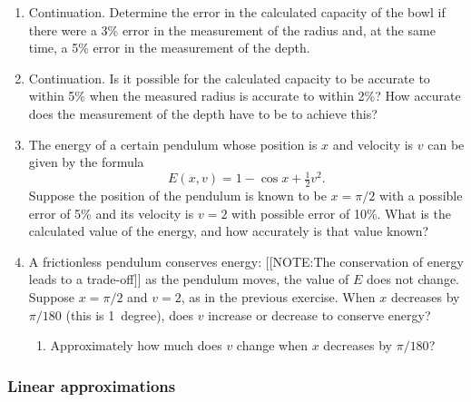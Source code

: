 \begin{enumerate}
\item Continuation.  Determine the error in the calculated capacity of
the bowl if there were a 3\% error in the measurement of the radius
and, at the same time, a 5\% error in the measurement of the depth.


\item Continuation.  Is it possible for the calculated capacity to be
accurate to within 5\% when the measured radius is accurate to within
2\%?  How accurate does the measurement of the depth have to be to
achieve this?


\item The energy of a certain pendulum whose position is $x$ and
velocity is $v$ can be given by the formula
	\[
E(x, v) = 1 - \cos{x} + \tfrac{1}{2} v^2.
\]
Suppose the position of the pendulum is known to be $x = \pi/2$ with a
possible error of 5\% and its velocity is $v = 2$ with possible error
of 10\%.  What is the calculated value of the energy, and how
accurately is that value known?


\item A frictionless pendulum conserves energy:
[[NOTE:The conservation  of energy leads to  a trade-off]]
as the pendulum moves, the value of $E$ does not change.  Suppose $x =
\pi/2$ and $v = 2$, as in the previous exercise.  When $x$ decreases
by $\pi/180$ (this is 1~degree), does $v$ increase or decrease to
conserve energy?

  \begin{enumerate}
  \item Approximately how much does $v$ change when $x$ decreases by
$\pi/180$?



\end{enumerate}
\end{enumerate}
\subsubsection{Linear approximations}
\label{subsubsec:linear-approximations}


